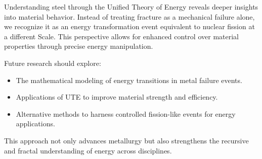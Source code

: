 \documentclass{article}
\begin{document}
Understanding steel through the Unified Theory of Energy reveals deeper insights into material behavior. Instead of treating fracture as a mechanical failure alone, we recognize it as an energy transformation event equivalent to nuclear fission at a different Scale. This perspective allows for enhanced control over material properties through precise energy manipulation.

Future research should explore:
\begin{itemize}
    \item The mathematical modeling of energy transitions in metal failure events.
    \item Applications of UTE to improve material strength and efficiency.
    \item Alternative methods to harness controlled fission-like events for energy applications.
\end{itemize}

This approach not only advances metallurgy but also strengthens the recursive and fractal understanding of energy across disciplines.
\end{document}
